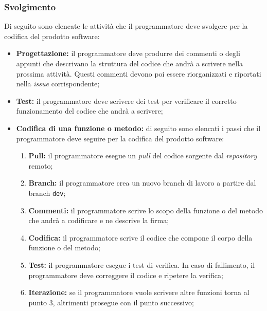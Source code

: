 \subsubsection{Svolgimento}
Di seguito sono elencate le attività che il programmatore deve svolgere per la
codifica del prodotto software:
\begin{itemize}
	\item \textbf{Progettazione:} il programmatore deve produrre dei commenti o
	      degli appunti che descrivano la struttura del codice che andrà a
	      scrivere nella prossima attività. Questi commenti devono poi essere
	      riorganizzati e riportati nella \textit{issue} corrispondente;

	\item \textbf{Test:} il programmatore deve scrivere dei test per verificare
	      il corretto funzionamento del codice che andrà a scrivere;

	\item \textbf{Codifica di una funzione o metodo:} di seguito sono elencati i
	      passi che il programmatore deve seguire per la codifica del prodotto
	      software:
	      \begin{enumerate}
		      \item \textbf{Pull:} il programmatore esegue un \textit{pull} del
		            codice sorgente dal \textit{repository} remoto;

		      \item \textbf{Branch:} il programmatore crea un nuovo branch di
		            lavoro a partire dal branch \texttt{dev};

		      \item \textbf{Commenti:} il programmatore scrive lo scopo della
		            funzione o del metodo che andrà a codificare e ne descrive
		            la firma;

		      \item \textbf{Codifica:} il programmatore scrive il codice che
		            compone il corpo della funzione o del metodo;

		      \item \textbf{Test:} il programmatore esegue i test di verifica.
		            In caso di fallimento, il programmatore deve correggere il
		            codice e ripetere la verifica;

		      \item \textbf{Iterazione:} se il programmatore vuole scrivere
		            altre funzioni torna al punto 3, altrimenti prosegue
		            con il punto successivo;


\end{enumerate}
\end{itemize}
